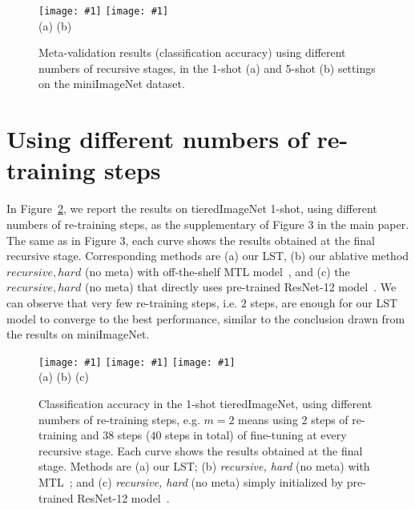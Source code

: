 \documentclass{article}
\begin{document}
\begin{figure}[h]
\newcommand{\plotexpone}[1]{\texttt{[image: \#1]}}
\plotexpone{supple_figures/figureS1a.eps}
\plotexpone{supple_figures/figureS1b.eps}\\
\hspace*{3.40cm} (a) \hspace{6.70cm}(b) \\
\vspace{-0.2cm}
\caption{Meta-validation results (classification accuracy) using different numbers of recursive stages, in the 1-shot (a) and 5-shot (b) settings on the miniImageNet dataset.}
\label{figure_diff_recursive_stage}
\end{figure} 

\section{Using different numbers of re-training steps}
\label{sec_supple_fig3}

In Figure~\ref{figure_re_train}, we report the results on tieredImageNet 1-shot, using different numbers of re-training steps, as the supplementary 
of Figure 3 in the main paper.
The same as in Figure 3, each curve shows the results obtained at the final recursive stage. Corresponding methods are (a) our LST, (b) our ablative method $recursive, hard$ (no meta) with off-the-shelf MTL model~\cite{SunCVPR2019}, and (c) the $recursive, hard$ (no meta) that directly uses pre-trained ResNet-12 model~\cite{SunCVPR2019}.
We can observe that very few re-training steps, i.e. $2$ steps, are enough for our LST model to converge to the best performance, similar to the conclusion drawn from the results on miniImageNet.


\begin{figure}[t]
\newcommand{\plotexpone}[1]{\texttt{[image: \#1]}}
\plotexpone{supple_figures/figureSa.eps}
\plotexpone{supple_figures/figureSb.eps}
\plotexpone{supple_figures/figureSc.eps}\\
\hspace*{2.31cm} (a) \hspace{4.18cm}(b) \hspace{4.18cm}(c)\\
\hspace*{2.40cm} 
\vspace{-0.2cm}
\caption{Classification accuracy in the 1-shot tieredImageNet, using different numbers of re-training steps, e.g. $m=2$ means using $2$ steps of re-training and $38$ steps ($40$ steps in total) of fine-tuning at every recursive stage. 
Each curve shows the results obtained at the final stage. Methods are (a) our LST; (b) \emph{recursive, hard} (no meta) with MTL~\cite{SunCVPR2019}; and (c) \emph{recursive, hard} (no meta) simply initialized by pre-trained ResNet-12 model~\cite{SunCVPR2019}.
}
\label{figure_re_train}
\end{figure} 
\end{document}
